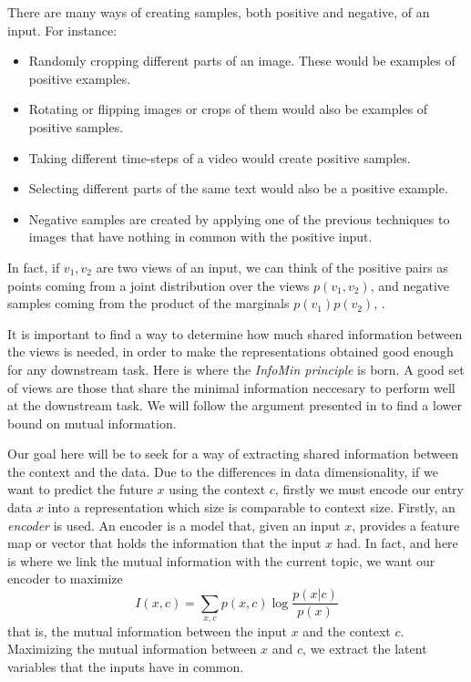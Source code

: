 There are many ways of creating samples, both positive and negative, of an input. For instance:
\begin{itemize}
    \item Randomly cropping different parts of an image. These would be examples of positive examples.
    \item Rotating or flipping images or crops of them would also be examples of positive samples.
    
    \item Taking different time-steps of a video would create positive samples.
    \item Selecting different parts of the same text would also be a positive example.    
    \item Negative samples are created by applying one of the previous techniques to images that have nothing in common with the positive input.
\end{itemize}

In fact, if $v_1,v_2$ are two views of an input, we can think of the positive pairs as points coming from a joint distribution over the views $p(v_1,v_2)$, and negative samples coming from the product of the marginals $p(v_1)p(v_2)$, \citep{tian_what_2020}.

It is important to find a way to determine how much shared information between the views is needed, in order to make the representations obtained good enough for any downstream task. Here is where the \emph{InfoMin principle} is born. A good set of views are those that share the minimal information neccesary to perform well at the downstream task. We will follow the argument presented in \cite{oord_representation_2019} to find a lower bound on mutual information.


Our goal here will be to seek for a way of extracting shared information between the context and the data. Due to the differences in data dimensionality, if we want to predict the future $x$ using the context $c$, firstly we must
encode our entry data $x$ into a representation which size is comparable to context size. Firstly, an \emph{encoder} is used. An encoder is a model that, given an input $x$, provides a feature map or vector that holds the information
that the input $x$ had. In fact, and here is where we link the mutual information with the current topic, we want our encoder to maximize
\begin{equation}\label{EQ:MI}
I(x,c) = \sum_{x,c}p(x,c)\log\frac{p(x|c)}{p(x)}
\end{equation}
that is, the mutual information between the input $x$ and the context $c$.  Maximizing the mutual information between $x$ and $c$, we extract the latent variables
that the inputs have in common.

